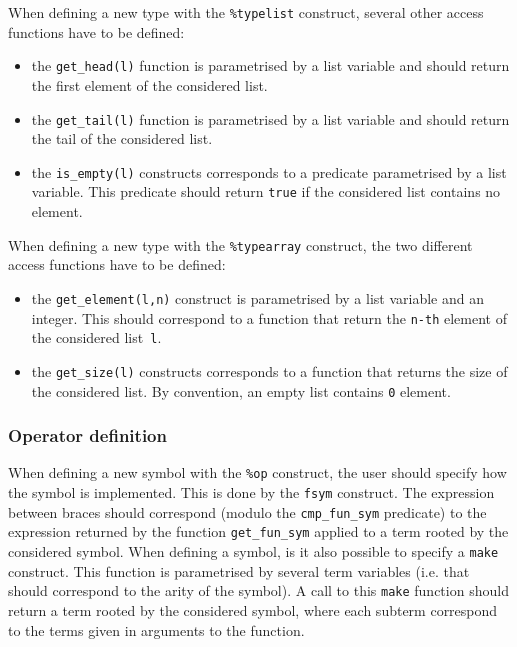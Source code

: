 \documentclass[a4paper]{article}
\begin{document}
\noindent
When defining a new type with the \texttt{\%typelist} construct,
several other access functions have to be defined:
\begin{itemize}
\item the \texttt{get\_head(l)} function is parametrised by a list
  variable and should return the first element of the considered list.

\item the \texttt{get\_tail(l)} function is parametrised by a list
  variable and should return the tail of the considered list.

\item the \texttt{is\_empty(l)} constructs corresponds to a
  predicate parametrised by a list variable.
  This predicate should return \texttt{true} if the considered list
  contains no element.
\end{itemize}

\noindent
When defining a new type with the \texttt{\%typearray} construct,
the two different access functions have to be defined:
\begin{itemize}
\item the \texttt{get\_element(l,n)} construct is parametrised by a list
  variable and an integer. This should correspond to a function that
  return the \texttt{n-th} element of the considered list~\texttt{l}.

\item the \texttt{get\_size(l)} constructs corresponds to a function
  that returns the size of the considered list.
  By convention, an empty list contains \texttt{0} element.
\end{itemize}

\subsubsection{Operator definition}

\noindent
When defining a new symbol with the \texttt{\%op} construct, the user
should specify how the symbol is implemented. This is done by the
\texttt{fsym} construct.
The expression between braces should correspond (modulo the
\texttt{cmp\_fun\_sym} predicate) to the expression returned by the
function \texttt{get\_fun\_sym} applied to a term rooted by the
considered symbol.  
When defining a symbol, is it also possible to specify a
\texttt{make} construct. This function is parametrised by several 
term variables (i.e. that should correspond to the arity of the
symbol). A call to this \texttt{make} function should return a term
rooted by the considered symbol, where each subterm correspond to the
terms given in arguments to the function.
\end{document}
